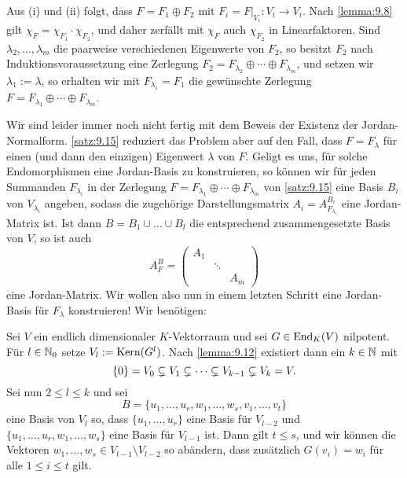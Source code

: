 \begin{beweis}
	Aus (i) und (ii) folgt, dass $F = F_1 \oplus F_2$ mit $F_i = F\big|_{V_i} \colon V_i \rightarrow V_i$.
	Nach \autoref{lemma:9.8} gilt $\chi_F = \chi_{F_1} \cdot \chi_{F_2}$, und daher zerfällt mit $\chi_F$ auch $\chi_{F_2}$ in Linearfaktoren.
	Sind $\lambda_2,\dots,\lambda_m$ die paarweise verschiedenen Eigenwerte von $F_2$, so besitzt $F_2$ nach Induktionsvoraussetzung eine Zerlegung $F_2 = F_{\lambda_2} \oplus \cdots \oplus F_{\lambda_m}$, und setzen wir $\lambda_1 := \lambda$, so erhalten wir mit $F_{\lambda_1} = F_1$ die gewünschte Zerlegung $F = F_{\lambda_1} \oplus \cdots \oplus F_{\lambda_m}$. \qedhere
\end{beweis}

\begin{bemerkung}
	\label{bem:9.16}
	Wir sind leider immer noch nicht fertig mit dem Beweis der Existenz der Jordan-Normalform.
	\autoref{satz:9.15} reduziert das Problem aber auf den Fall, dass $F = F_\lambda$ für einen (und dann den einzigen) Eigenwert $\lambda$ von $F$.
	Geligt es uns, für solche Endomorphismen eine Jordan-Basis zu konstruieren, so können wir für jeden Summanden $F_{\lambda_i}$ in der Zerlegung $F = F_{\lambda_1} \oplus \cdots \oplus F_{\lambda_m}$ von \autoref{satz:9.15} eine Basis $B_i$ von $V_{\lambda_i}$ angeben, sodass die zugehörige Darstellungsmatrix $A_i = A^{B_i}_{F_{\lambda_i}}$ eine Jordan-Matrix ist.
	Ist dann $B = B_1 \cup \dots \cup B_l$ die entsprechend zusammengesetzte Basis von $V$, so ist auch
	\[
		A_F^B = \begin{pmatrix}
			A_1 & & \\
			 & \ddots & \\
			 & & A_m
		\end{pmatrix}
	\]
	eine Jordan-Matrix.
	Wir wollen also nun in einem letzten Schritt eine Jordan-Basis für $F_\lambda$ konstruieren! Wir benötigen:
\end{bemerkung}

\begin{lemma}
	\label{lemma:9.17}
	Sei $V$ ein endlich dimensionaler $K$-Vektorraum und sei $G \in \operatorname{End}_K(V)$ nilpotent.
	Für $l \in \mathbb{N}_0$ setze $V_l := \operatorname{Kern}(G^l)$.
	Nach \autoref{lemma:9.12} existiert dann ein $k \in \mathbb{N}$ mit
	\[
		\{0\} = V_0 \subsetneq V_1 \subsetneq \cdots \subsetneq V_{k-1} \subsetneq V_k = V.
	\]
	Sei nun $2 \leq l \leq k$ und sei
	\[
		B = \{u_1,\dots,u_r,w_1,\dots,w_s,v_1,\dots,v_t\}
	\]
	eine Basis von $V_l$ so, dass $\{u_1,\dots,u_r\}$ eine Basis für $V_{l-2}$ und $\{u_1,\dots,u_r,w_1,\dots,w_s\}$ eine Basis für $V_{l-1}$ ist.
	Dann gilt $t \leq s$, und wir können die Vektoren $w_1,\dots,w_s \in V_{l-1} \setminus V_{l-2}$ so abändern, dass zusätzlich $G(v_i) = w_i$ für alle $1 \leq i \leq t$ gilt.
\end{lemma}


